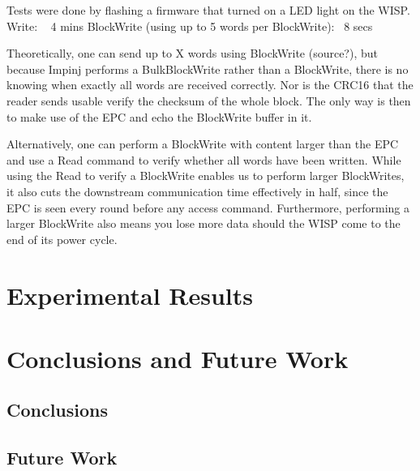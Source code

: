 \documentclass[11pt,twoside,a4paper,openright]{report}
\begin{document}
Tests were done by flashing a firmware that turned on a LED light on the WISP.
Write: ~ 4 mins
BlockWrite (using up to 5 words per BlockWrite): ~8 secs

Theoretically, one can send up to X words using BlockWrite (source?), but because Impinj performs a BulkBlockWrite rather than a BlockWrite, there is no knowing when exactly all words are received correctly.
Nor is the CRC16 that the reader sends usable verify the checksum of the whole block.
The only way is then to make use of the EPC and echo the BlockWrite buffer in it.

Alternatively, one can perform a BlockWrite with content larger than the EPC and use a Read command to verify whether all words have been written.
While using the Read to verify a BlockWrite enables us to perform larger BlockWrites, it also cuts the downstream communication time effectively in half, since the EPC is seen every round before any access command.
Furthermore, performing a larger BlockWrite also means you lose more data should the WISP come to the end of its power cycle.

\chapter{Experimental Results}
\label{results}


\chapter{Conclusions and Future Work}
\label{conclusions}

\section{Conclusions}

\section{Future Work}






%
\end{document}
